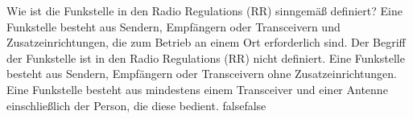     {Wie ist die Funkstelle in den Radio Regulations (RR) sinngemäß definiert?}
    {Eine Funkstelle besteht aus Sendern, Empfängern oder Transceivern und  Zusatzeinrichtungen, die zum Betrieb an einem Ort erforderlich sind.}
    {Der Begriff der Funkstelle ist in den Radio Regulations (RR) nicht definiert.}
    {Eine Funkstelle besteht aus Sendern, Empfängern oder Transceivern ohne Zusatzeinrichtungen.}
    {Eine Funkstelle besteht aus mindestens einem Transceiver und einer Antenne einschließlich der Person, die diese bedient.}
    {false}{false}